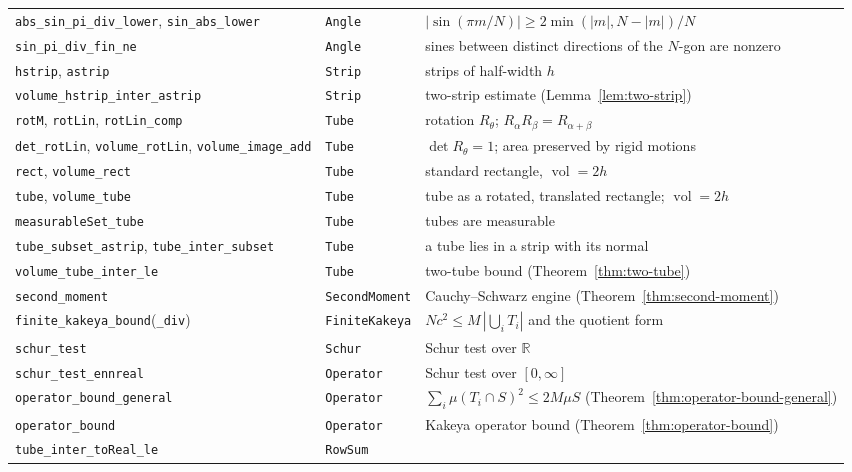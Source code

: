 \documentclass[11pt,a4paper]{article}
\newcommand{\R}{\mathbb{R}}
\newcommand{\ennr}{\ensuremath{[0,\infty]}}          %
\newcommand{\vol}{\operatorname{vol}}                %
\newcommand{\lname}[1]{\texttt{#1}}                  %
\newcommand{\lb}{\_\allowbreak}                      %
\theoremstyle{definition}
\theoremstyle{remark}
\begin{document}
\begin{longtable}{@{}>{\raggedright\arraybackslash}p{}
                    >{\raggedright\arraybackslash}p{}
                    >{\raggedright\arraybackslash}p{}@{}}
\lname{abs\lb sin\lb pi\lb div\lb lower}, \lname{sin\lb abs\lb lower} & \lname{Angle} &
  $|\sin(\pi m/N)|\ge 2\min(|m|,N-|m|)/N$ \\
\lname{sin\lb pi\lb div\lb fin\lb ne} & \lname{Angle} &
  sines between distinct directions of the $N$-gon are nonzero \\
\midrule
\lname{hstrip}, \lname{astrip} & \lname{Strip} & strips of half-width $h$ \\
\lname{volume\lb hstrip\lb inter\lb astrip} & \lname{Strip} &
  two-strip estimate (Lemma~\ref{lem:two-strip}) \\
\lname{rotM}, \lname{rotLin}, \lname{rotLin\lb comp} & \lname{Tube} &
  rotation $R_\theta$; $R_\alpha R_\beta = R_{\alpha+\beta}$ \\
\lname{det\lb rotLin}, \lname{volume\lb rotLin}, \lname{volume\lb image\lb add} &
  \lname{Tube} & $\det R_\theta=1$; area preserved by rigid motions \\
\lname{rect}, \lname{volume\lb rect} & \lname{Tube} &
  standard rectangle, $\vol=2h$ \\
\lname{tube}, \lname{volume\lb tube} & \lname{Tube} &
  tube as a rotated, translated rectangle; $\vol=2h$ \\
\lname{measurableSet\lb tube} & \lname{Tube} & tubes are measurable \\
\lname{tube\lb subset\lb astrip}, \lname{tube\lb inter\lb subset} & \lname{Tube} &
  a tube lies in a strip with its normal \\
\lname{volume\lb tube\lb inter\lb le} & \lname{Tube} &
  two-tube bound (Theorem~\ref{thm:two-tube}) \\
\midrule
\lname{second\lb moment} & \lname{SecondMoment} &
  Cauchy--Schwarz engine (Theorem~\ref{thm:second-moment}) \\
\lname{finite\lb kakeya\lb bound}(\lname{\lb div}) & \lname{FiniteKakeya} &
  $Nc^2\le M\,|\bigcup_i T_i|$ and the quotient form \\
\lname{schur\lb test} & \lname{Schur} & Schur test over $\R$ \\
\lname{schur\lb test\lb ennreal} & \lname{Operator} & Schur test over $\ennr$ \\
\lname{operator\lb bound\lb general} & \lname{Operator} &
  $\sum_i\mu(T_i\cap S)^2\le 2M\mu S$
  (Theorem~\ref{thm:operator-bound-general}) \\
\lname{operator\lb bound} & \lname{Operator} &
  Kakeya operator bound (Theorem~\ref{thm:operator-bound}) \\
\lname{tube\lb inter\lb toReal\lb le} & \lname{RowSum} &

\end{longtable}
\end{document}
